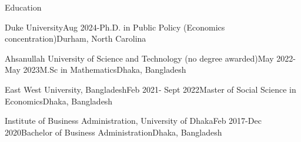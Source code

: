 \documentclass[
	9pt, %
]{resume} %
\begin{document}

\begin{rSection}{Education}
	\singlesspacing
	\begin{rSubsection}{Duke University}{Aug 2024-}{Ph.D. in Public Policy (Economics concentration)}{Durham, North Carolina}
	\end{rSubsection}
	\begin{rSubsection}{Ahsanullah University of Science and Technology (no degree awarded)}{May 2022-May 2023}{M.Sc in Mathematics}{Dhaka, Bangladesh}
	\end{rSubsection}	

	\begin{rSubsection}{East West University, Bangladesh}{Feb 2021- Sept 2022}{Master of Social Science in Economics}{Dhaka, Bangladesh}
	\end{rSubsection}

	\begin{rSubsection}{Institute of Business Administration, University of Dhaka}{Feb 2017-Dec 2020}{Bachelor of Business Administration}{Dhaka, Bangladesh}
	\end{rSubsection}		

	
\end{rSection}
\end{document}
